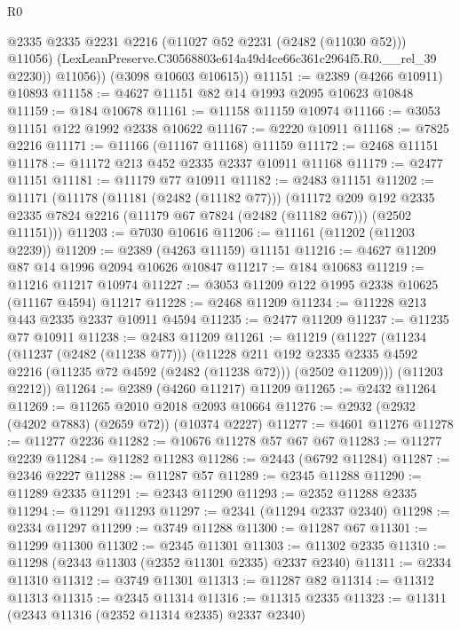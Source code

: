 \begin{lexlean}{R0}
\begin{coremodule}
              @2335
              @2335
              @2231
              @2216
              (@11027 @52 @2231 (@2482 (@11030 @52)))
              @11056)
            (LexLeanPreserve.C30568803e614a49d4ce66c361c2964f5.R0.__rel_39 @2230))
          @11056))
      (@3098 @10603 @10615))
@11151 := @2389 (@4266 @10911) @10893
@11158 := @4627 @11151 @82 @14 @1993 @2095 @10623 @10848
@11159 := @184 @10678
@11161 := @11158 @11159 @10974
@11166 := @3053 @11151 @122 @1992 @2338 @10622
@11167 := @2220 @10911
@11168 := @7825 @2216
@11171 := @11166 (@11167 @11168) @11159
@11172 := @2468 @11151
@11178 := @11172 @213 @452 @2335 @2337 @10911 @11168
@11179 := @2477 @11151
@11181 := @11179 @77 @10911
@11182 := @2483 @11151
@11202 := @11171
    (@11178
      (@11181 (@2482 (@11182 @77)))
      (@11172
        @209
        @192
        @2335
        @2335
        @7824
        @2216
        (@11179 @67 @7824 (@2482 (@11182 @67)))
        (@2502 @11151)))
@11203 := @7030 @10616
@11206 := @11161 (@11202 (@11203 @2239))
@11209 := @2389 (@4263 @11159) @11151
@11216 := @4627 @11209 @87 @14 @1996 @2094 @10626 @10847
@11217 := @184 @10683
@11219 := @11216 @11217 @10974
@11227 := @3053 @11209 @122 @1995 @2338 @10625 (@11167 @4594) @11217
@11228 := @2468 @11209
@11234 := @11228 @213 @443 @2335 @2337 @10911 @4594
@11235 := @2477 @11209
@11237 := @11235 @77 @10911
@11238 := @2483 @11209
@11261 := @11219
    (@11227
      (@11234
        (@11237 (@2482 (@11238 @77)))
        (@11228
          @211
          @192
          @2335
          @2335
          @4592
          @2216
          (@11235 @72 @4592 (@2482 (@11238 @72)))
          (@2502 @11209)))
      (@11203 @2212))
@11264 := @2389 (@4260 @11217) @11209
@11265 := @2432 @11264
@11269 := @11265 @2010 @2018 @2093 @10664
@11276 := @2932 (@2932 (@4202 @7883) (@2659 @72)) (@10374 @2227)
@11277 := @4601 @11276
@11278 := @11277 @2236
@11282 := @10676 @11278 @57 @67 @67
@11283 := @11277 @2239
@11284 := @11282 @11283
@11286 := @2443 (@6792 @11284)
@11287 := @2346 @2227
@11288 := @11287 @57
@11289 := @2345 @11288
@11290 := @11289 @2335
@11291 := @2343 @11290
@11293 := @2352 @11288 @2335
@11294 := @11291 @11293
@11297 := @2341 (@11294 @2337 @2340)
@11298 := @2334 @11297
@11299 := @3749 @11288
@11300 := @11287 @67
@11301 := @11299 @11300
@11302 := @2345 @11301
@11303 := @11302 @2335
@11310 := @11298 (@2343 @11303 (@2352 @11301 @2335) @2337 @2340)
@11311 := @2334 @11310
@11312 := @3749 @11301
@11313 := @11287 @82
@11314 := @11312 @11313
@11315 := @2345 @11314
@11316 := @11315 @2335
@11323 := @11311 (@2343 @11316 (@2352 @11314 @2335) @2337 @2340)

\end{coremodule}
\end{lexlean}
